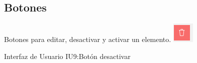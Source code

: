\begin{figure}[htbp!]
	\begin{center}
	 \subsection{Botones}
	Botones para editar, desactivar y activar un elemento.
\includegraphics[width=\textwidth]{Pantallas/bottonDesactivar}
		\caption{Interfaz de Usuario IU9:Botón desactivar}
	\end{center}
\end{figure}



